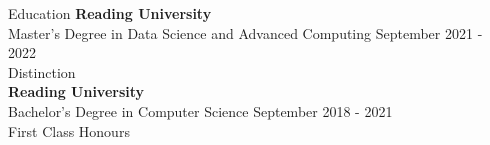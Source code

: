 \begin{rSection}{Education}
{\bf Reading University} \\ 
{Master's Degree in Data Science and Advanced Computing} \hfill
{September 2021 - 2022} \\\hfill 
{Distinction}
\vspace{0.25cm}\\
{\bf Reading University} \\ 
{Bachelor's Degree in Computer Science} \hfill
{September 2018 - 2021} \\\hfill 
{First Class Honours}
\end{rSection}